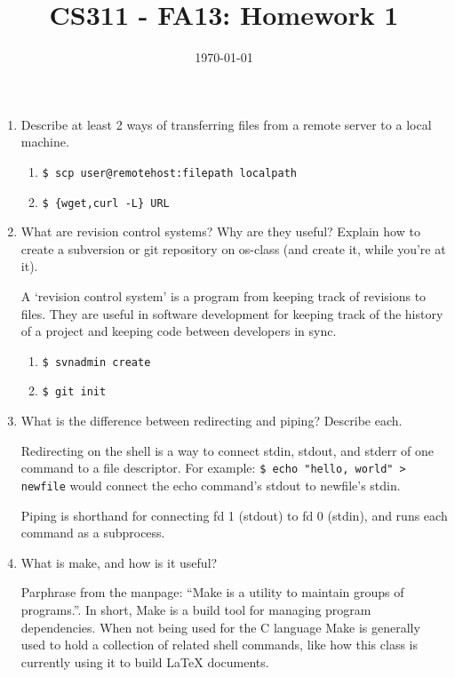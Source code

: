 \documentclass[letterpaper,10pt]{article}
\title{CS311 - FA13: Homework 1}
\date{\today}
\author{\name}
\begin{document}
\maketitle

\begin{enumerate}
\item Describe at least 2 ways of transferring files from a remote server to a local machine.
    \begin{enumerate}
        \item \texttt{\$ scp user@remotehost:filepath localpath}
        \item \texttt{\$ \{wget,curl -L\} URL}
    \end{enumerate}

\item What are revision control systems? Why are they useful? Explain how to create a subversion or git repository on os-class (and create it, while you're at it).

A `revision control system' is a program from keeping track of revisions
to files. They are useful in software development for keeping track of
the history of a project and keeping code between developers in sync.

    \begin{enumerate}
        \item \texttt{\$ svnadmin create}
        \item \texttt{\$ git init}
    \end{enumerate}

\item What is the difference between redirecting and piping? Describe each.

Redirecting on the shell is a way to connect stdin, stdout, and stderr
of one command to a file descriptor. For example:
\texttt{\$ echo "hello, world" > newfile} would connect the echo
command's stdout to newfile's stdin. 

Piping is shorthand for connecting fd 1 (stdout) to fd 0 (stdin), and
runs each command as a subprocess.

\item What is make, and how is it useful?

Parphrase from the manpage: ``Make is a utility to maintain groups of
programs.''. In short, Make is a build tool for managing program
dependencies. When not being used for the C language Make is generally
used to hold a collection of related shell commands, like how this class
is currently using it to build LaTeX documents.


\end{enumerate}
\end{document}
